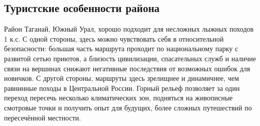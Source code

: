 \subsection{Туристские особенности района}
Район Таганай, Южный Урал, хорошо подходит для несложных лыжных походов 1 к.с. С одной стороны, здесь можно чувствовать себя в относительной безопасности: большая часть маршрута проходит по национальному парку с развитой сетью приютов, а близость цивилизации, спасательных служб и наличие связи на вершинах снижают негативные последствия от возможных ошибок для новичков. С другой стороны, маршруты здесь зрелищнее и динамичнее, чем равнинные походы в Центральной России. Горный рельеф позволяет за один переход пересечь несколько климатических зон, подняться на живописные смотровые точки и получить опыт для будущих, более сложных путешествий по пересечённой местности.
\clearpage